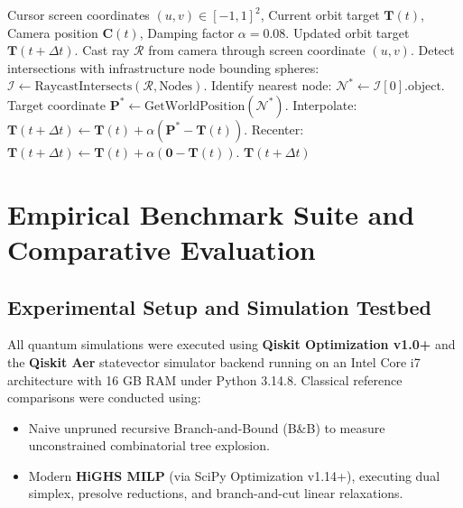 \documentclass[11pt,a4paper]{article}
\theoremstyle{definition}
\theoremstyle{remark}
\begin{document}
\begin{algorithm}[H]
\caption{Precision Smart Zoom Target Interpolation}
\label{alg:smart_zoom}
\begin{algorithmic}[1]
\REQUIRE Cursor screen coordinates $(u, v) \in [-1, 1]^2$, Current orbit target $\mathbf{T}(t)$, Camera position $\mathbf{C}(t)$, Damping factor $\alpha = 0.08$.
\ENSURE Updated orbit target $\mathbf{T}(t + \Delta t)$.
\STATE Cast ray $\mathcal{R}$ from camera through screen coordinate $(u, v)$.
\STATE Detect intersections with infrastructure node bounding spheres: $\mathcal{I} \leftarrow \text{RaycastIntersects}(\mathcal{R}, \text{Nodes})$.
    \STATE Identify nearest node: $\mathcal{N}^* \leftarrow \mathcal{I}[0].\text{object}$.
    \STATE Target coordinate $\mathbf{P}^* \leftarrow \text{GetWorldPosition}(\mathcal{N}^*)$.
    \STATE Interpolate: $\mathbf{T}(t + \Delta t) \leftarrow \mathbf{T}(t) + \alpha (\mathbf{P}^* - \mathbf{T}(t))$.
\ELSE
        \STATE Recenter: $\mathbf{T}(t + \Delta t) \leftarrow \mathbf{T}(t) + \alpha (\mathbf{0} - \mathbf{T}(t))$.
    \ENDIF
\ENDIF
\RETURN $\mathbf{T}(t + \Delta t)$
\end{algorithmic}
\end{algorithm}


\section{Empirical Benchmark Suite and Comparative Evaluation}
\label{sec:benchmarks}

\subsection{Experimental Setup and Simulation Testbed}
All quantum simulations were executed using \textbf{Qiskit Optimization v1.0+} and the \textbf{Qiskit Aer} statevector simulator backend running on an Intel Core i7 architecture with 16 GB RAM under Python 3.14.8. Classical reference comparisons were conducted using:
\begin{itemize}
    \item Naive unpruned recursive Branch-and-Bound (B\&B) to measure unconstrained combinatorial tree explosion.
    \item Modern \textbf{HiGHS MILP} (via SciPy Optimization v1.14+), executing dual simplex, presolve reductions, and branch-and-cut linear relaxations.
\end{itemize}
\end{document}
